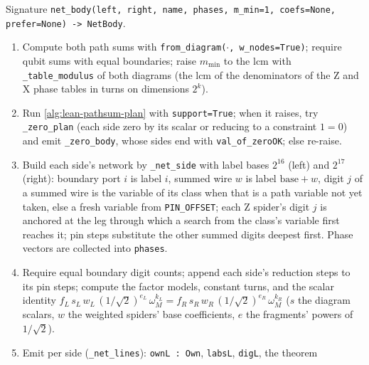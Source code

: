 \begin{algorithm}
Signature \textnormal{\texttt{net\_\allowbreak{}body(\allowbreak{}left,\allowbreak{} right,\allowbreak{} name,\allowbreak{} phases,\allowbreak{} m\_\allowbreak{}min=1,\allowbreak{} coefs=None,\allowbreak{} prefer=None) -{}> NetBody}}.
\begin{enumerate}
\item Compute both path sums with \textnormal{\texttt{from\_\allowbreak{}diagram(\allowbreak{}\ensuremath{\cdot},\allowbreak{} w\_\allowbreak{}nodes=True)}}; require qubit sums with equal
  boundaries; raise $m_{\min}$ to the lcm with \textnormal{\texttt{\_\allowbreak{}table\_\allowbreak{}modulus}} of both diagrams (the lcm of the
  denominators of the Z and X phase tables in turns on dimensions $2^k$).
\item Run \cref{alg:lean-pathsum-plan} with \textnormal{\texttt{support=True}}; when it raises, try
  \textnormal{\texttt{\_\allowbreak{}zero\_\allowbreak{}plan}} (each side zero by its scalar or reducing to a constraint $1=0$) and emit
  \textnormal{\texttt{\_\allowbreak{}zero\_\allowbreak{}body}}, whose sides end with \textnormal{\texttt{val\_\allowbreak{}of\_\allowbreak{}zeroOK}}; else re-raise.
\item Build each side's network by \textnormal{\texttt{\_\allowbreak{}net\_\allowbreak{}side}} with label bases $2^{16}$ (left) and $2^{17}$
  (right): boundary port $i$ is label $i$, summed wire $w$ is label $\text{base}+w$, digit $j$ of a
  summed wire is the variable of its class when that is a path variable not yet taken, else a
  fresh variable from \textnormal{\texttt{PIN\_\allowbreak{}OFFSET}}; each Z spider's digit $j$ is anchored at the leg through
  which a search from the class's variable first reaches it; pin steps substitute the other
  summed digits deepest first. Phase vectors are collected into \textnormal{\texttt{phases}}.
\item Require equal boundary digit counts; append each side's reduction steps to its pin steps;
  compute the factor models, constant turns, and the scalar identity
  $f_L\,s_L\,w_L\,(1/\sqrt2)^{e_L}\,\omega_M^{k_L} = f_R\,s_R\,w_R\,(1/\sqrt2)^{e_R}\,\omega_M^{k_R}$
  ($s$ the diagram scalars, $w$ the weighted spiders' base coefficients, $e$ the fragments'
  powers of $1/\sqrt2$).
\item Emit per side (\textnormal{\texttt{\_\allowbreak{}net\_\allowbreak{}lines}}): \textnormal{\texttt{ownL : Own}}, \textnormal{\texttt{labsL}}, \textnormal{\texttt{digL}}, the theorem

\end{enumerate}
\end{algorithm}
